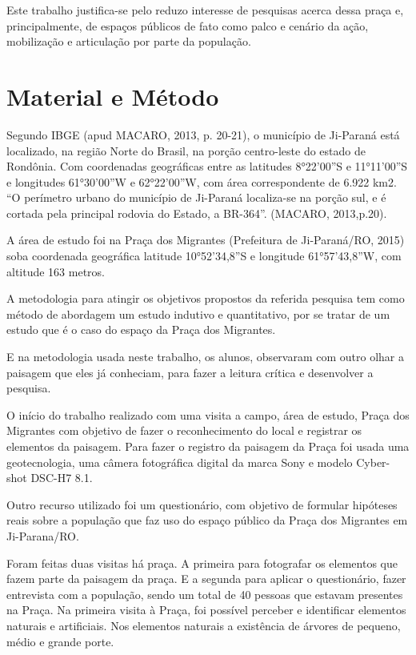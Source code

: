 \documentclass[article,12pt,onesidea,4paper,english,brazil]{abntex2}
\begin{document}
	Este trabalho justifica-se pelo reduzo interesse de pesquisas acerca dessa praça e, principalmente, de espaços públicos de fato como palco e cenário da ação, mobilização e articulação por parte da população.
	
	
	\section*{Material e Método}
	
	Segundo IBGE (apud MACARO, 2013, p. 20-21), o município de Ji-Paraná está localizado, na região Norte do Brasil, na porção centro-leste do estado de Rondônia. Com coordenadas geográficas entre as latitudes 8°22’00”S e 11°11’00”S e longitudes 61°30’00”W e 62°22’00”W, com área correspondente de 6.922 km2. “O perímetro urbano do município de Ji-Paraná localiza-se na porção sul, e é cortada pela principal rodovia do Estado, a BR-364”. (MACARO, 2013,p.20).
	
	A área de estudo foi na Praça dos Migrantes (Prefeitura de Ji-Paraná/RO, 2015) soba coordenada geográfica latitude 10°52’34,8”S e longitude 61°57’43,8”W, com altitude 163 metros.
	
	A metodologia para atingir os objetivos propostos da referida pesquisa tem como método de abordagem um estudo indutivo e quantitativo, por se tratar de um estudo que é o caso do espaço da Praça dos Migrantes.
	
	E na metodologia usada neste trabalho, os alunos, observaram com outro olhar a paisagem que eles já conheciam, para fazer a leitura crítica e desenvolver a pesquisa.
	
	O início do trabalho realizado com uma visita a campo, área de estudo, Praça dos Migrantes com objetivo de fazer o reconhecimento do local e registrar os elementos da paisagem. Para fazer o registro da paisagem da Praça foi usada uma geotecnologia, uma câmera fotográfica digital da marca Sony e modelo Cyber-shot DSC-H7 8.1.
	
	Outro recurso utilizado foi um questionário, com objetivo de formular hipóteses reais sobre a população que faz uso do espaço público da Praça dos Migrantes em Ji-Parana/RO.
	
	Foram feitas duas visitas há praça. A primeira para fotografar os elementos que fazem parte da paisagem da praça. E a segunda para aplicar o questionário, fazer entrevista com a população, sendo um total de 40 pessoas que estavam presentes na Praça.
	Na primeira visita à Praça, foi possível perceber e identificar elementos naturais e artificiais. Nos elementos naturais a existência de árvores de pequeno, médio e grande porte.
	
\end{document}
